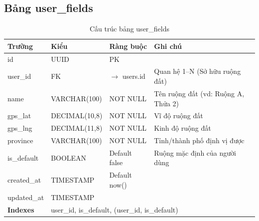 \documentclass[12pt,a4paper]{article}
\begin{document}
\subsection{Bảng user\_fields}
\begin{longtable}{|l|l|l|p{5.5cm}|}
    \caption{Cấu trúc bảng user\_fields}                                                                                                                  \\
    \hline
    \rowcolor{headerblue}
    \textbf{Trường}  & \textbf{Kiểu}                                                       & \textbf{Ràng buộc}     & \textbf{Ghi chú}                    \\
    \hline
    id               & UUID                                                                & PK                     &                                     \\
    \hline
    user\_id         & FK                                                                  & $\rightarrow$ users.id & Quan hệ 1--N (Sở hữu ruộng đất)     \\
    \hline
    name             & VARCHAR(100)                                                        & NOT NULL               & Tên ruộng đất (vd: Ruộng A, Thửa 2) \\
    \hline
    gps\_lat         & DECIMAL(10,8)                                                       & NOT NULL               & Vĩ độ ruộng đất                     \\
    \hline
    gps\_lng         & DECIMAL(11,8)                                                       & NOT NULL               & Kinh độ ruộng đất                   \\
    \hline
    province         & VARCHAR(100)                                                        & NOT NULL               & Tỉnh/thành phố định vị được         \\
    \hline
    is\_default      & BOOLEAN                                                             & Default false          & Ruộng mặc định của người dùng       \\
    \hline
    created\_at      & TIMESTAMP                                                           & Default now()          &                                     \\
    \hline
    updated\_at      & TIMESTAMP                                                           &                        &                                     \\
    \hline
    \rowcolor{headerblue}
    \textbf{Indexes} & \multicolumn{3}{l|}{user\_id, is\_default, (user\_id, is\_default)}                                                                \\
    \hline
\end{longtable}
\end{document}
